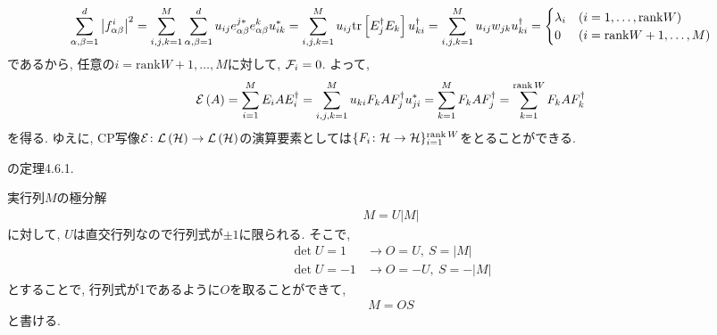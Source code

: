 \begin{ex}
    \begin{align*}
        \sum_{\alpha,\beta=1}^d
        \left| f_{\alpha \beta}^{i} \right|^2
        =
        \sum_{i,j,k=1}^M
        \sum_{\alpha, \beta = 1}^d
        u_{i j} e_{\alpha \beta}^{j*} e_{\alpha \beta}^k u_{ik}^*
        =
        \sum_{i,j,k=1}^M
        u_{ij} \mathrm{tr}\left[ E_j^\dagger E_k\right] u^\dagger_{ki}
        =
        \sum_{i,j,k=1}^M u_{ij} w_{jk} u^\dagger_{ki}
        =
        \begin{cases}
            \lambda_i & ( i = 1, \dots, \mathrm{rank} W)      \\
            0         & ( i = \mathrm{rank} W + 1, \dots , M)
        \end{cases}
    \end{align*}
    であるから, 任意の$i = \mathrm{rank} W + 1, \dots , M $に対して, $\mathcal{F}_i = 0$.
    よって,
    \begin{align*}
        \mathcal{E} \left( A \right)
        =
        \sum_{i=1}^M 
        E_i A E_i^{\dagger}
        =
        \sum_{i,j,k=1}^M
        u_{ki}F_k A F_j^{\dagger} u_{ji}^*
        =
        \sum_{k=1}^M
        F_k A F_j^{\dagger}
        =
        \sum_{k=1}^{\operatorname{rank} W}
        F_k A F_k^\dagger
    \end{align*}
    を得る.
    ゆえに, CP写像$\mathcal{E} \colon \mathcal{L}\left({\mathcal{H}}\right) \to \mathcal{L}\left({\mathcal{H}}\right)$の演算要素としては$\{F_i \colon \mathcal{H} \to \mathcal{H} \}_{i=1}^{\operatorname{rank} W}$をとることができる.
\end{ex}

\begin{ex}
    \label{ex8.11}
    \cite{Ishizaka2012}の定理4.6.1.
\end{ex}

\begin{ex}
    \label{ex8.12}
    実行列$M$の極分解
    \begin{align*}
        M = U |M|
    \end{align*}
    に対して, $U$は直交行列なので行列式が$\pm1$に限られる. そこで,
    \begin{align*}
        \det U = 1  & \rightarrow O = U, \ S = |M|   \\
        \det U = -1 & \rightarrow O = -U, \ S = -|M|
    \end{align*}
    とすることで, 行列式が1であるように$O$を取ることができて,
    \begin{align*}
        M = OS
    \end{align*}
    と書ける.
\end{ex}

